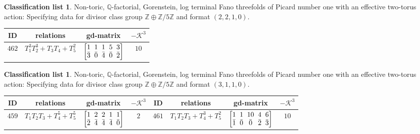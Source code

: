 \documentclass[pdftex]{sigma}%
\theoremstyle{definition}
\newtheorem{class-list}[thm]{Classification list}
\def\ZZ{{\mathbb Z}}
\def\QQ{{\mathbb Q}}
\numberwithin{equation}{section}
\begin{document}
\begin{class-list}\label{class-list(0,5)}
Non-toric, $\QQ$-factorial, Gorenstein, log terminal Fano
threefolds of Picard number one with an effective two-torus action:
Specifying data for divisor class group $\ZZ\oplus \ZZ/5\ZZ$ and
format $(2,2,1,0)$.
\begin{table}[h!]\centering\setlength{\tabcolsep}{5.5pt}
\renewcommand{\arraystretch}{1.15}\small\tabulinesep=1mm
\begin{tabu}{c|c|c|c}
\hline
ID&relations&gd-matrix&$-\mathcal{K}^3$
\\
\hline
${462}$&${T_{1}^{3}T_{2}^{3}+T_{3}T_{4}+T_{5}^{2}}$
&$\arraycolsep=1mm\begin{bmatrix}{1} & {1} & {1} & {5} & {3} \\ {\bar{3}} & {\bar{0}} & {\bar{4}} & {\bar{0}} & {\bar{2}}\end{bmatrix}$&${10}$
\\
\hline
\end{tabu}%
\end{table}
\end{class-list}


\begin{class-list}
Non-toric, $\QQ$-factorial, Gorenstein, log terminal Fano
threefolds of Picard number one with an effective two-torus action:
Specifying data for divisor class group $\ZZ\oplus \ZZ/5\ZZ$ and
format $(3,1,1,0)$.
\begin{table}[h!]\centering\setlength{\tabcolsep}{3.5pt}
\renewcommand{\arraystretch}{1.15}\small\tabulinesep=1mm
\begin{tabu}{c|c|c|c||c|c|c|c}
\hline
ID&relations&gd-matrix&$-\mathcal{K}^3$&ID&relations&gd-matrix&$-\mathcal{K}^3$
\\
\hline
${459}$&${T_{1}T_{2}T_{3}+T_{4}^{5}+T_{5}^{5}}$
&$\arraycolsep=1mm\begin{bmatrix}{1} & {2} & {2} & {1} & {1} \\ {\bar{2}} & {\bar{4}} & {\bar{4}} & {\bar{4}} & {\bar{0}}\end{bmatrix}$&${2}$
&${461}$&${T_{1}T_{2}T_{3}+T_{4}^{3}+T_{5}^{2}}$
&$\arraycolsep=1mm\begin{bmatrix}{1} & {1} & {10} & {4} & {6} \\ {\bar{1}} & {\bar{0}} & {\bar{0}} & {\bar{2}} & {\bar{3}}\end{bmatrix}$&${10}$
\\
\hline
\end{tabu}%
\end{table}
\end{class-list}
\end{document}
